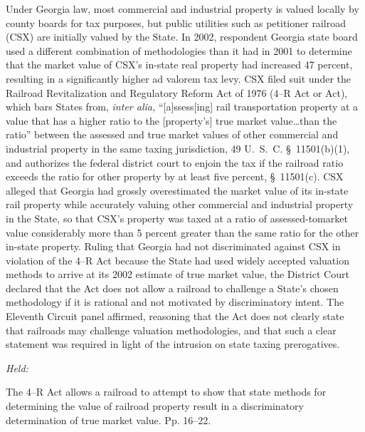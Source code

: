 
\setcounter{page}{9}

\noindent Under Georgia law, most commercial and industrial property is valued
locally by county boards for tax purposes, but public utilities such
as petitioner railroad (CSX) are initially valued by the State. In
2002, respondent Georgia state board used a different combination
of methodologies than it had in 2001 to determine that the market
value of CSX's in-state real property had increased 47 percent,
resulting in a significantly higher ad valorem tax levy. CSX filed
suit under the Railroad Revitalization and Regulatory Reform Act of
1976 (4--R Act or Act), which bars States from, \emph{inter alia,}
``[a]ssess[ing] rail transportation property at a value that has a
higher ratio to the [property's] true market value\dots than
the ratio'' between the assessed and true market values of other
commercial and industrial property in the same taxing jurisdiction,
49 U.~S.~C. \S~11501(b)(1), and authorizes the federal district
court to enjoin the tax if the railroad ratio exceeds the ratio for
other property by at least five percent, \S~11501(c). CSX alleged that
Georgia had grossly overestimated the market value of its in-state
rail property while accurately valuing other commercial and industrial
property in the State, so that CSX's property was taxed at a ratio of
assessed-tomarket value considerably more than 5 percent greater than
the same ratio for the other in-state property. Ruling that Georgia had
not discriminated against CSX in violation of the 4--R Act because the
State had used widely accepted valuation methods to arrive at its 2002
estimate of true market value, the District Court declared that the Act
does not allow a railroad to challenge a State's chosen methodology if
it is rational and not motivated by discriminatory intent. The Eleventh
Circuit panel affirmed, reasoning that the Act does not clearly state
that railroads may challenge valuation methodologies, and that such a
clear statement was required in light of the intrusion on state taxing
prerogatives.

\emph{Held:}

  The 4--R Act allows a railroad to attempt to show that state
methods for determining the value of railroad property result in a
discriminatory determination of true market value. Pp. 16--22.

